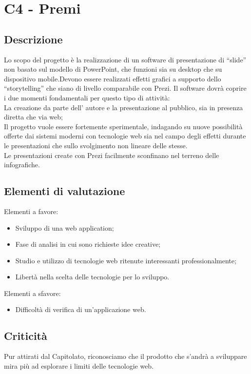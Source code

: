 \section{C4 - Premi}{
 \subsection{Descrizione}
   Lo scopo del progetto è la realizzazione di un software di presentazione di “slide” non basato sul modello di PowerPoint, che funzioni sia su desktop che su dispositivo mobile.Devono essere realizzati effetti grafici a supporto dello  “storytelling” che siano di livello comparabile con Prezi.
   Il software dovrà coprire i due momenti fondamentali per questo tipo di attività:\\
   La creazione da parte dell' autore e la presentazione al pubblico, sia in presenza diretta che via web;\\
   Il progetto vuole essere fortemente sperimentale, indagando su nuove possibilità  offerte dai sistemi moderni con tecnologie web sia nel campo degli effetti durante
   le presentazioni che sullo svolgimento non lineare delle stesse.\\
   Le presentazioni create con Prezi facilmente sconfinano nel terreno delle infografiche.
	\subsection{Elementi di valutazione}{
		Elementi a favore:
		\begin{itemize}
			\item Sviluppo di una web application;
			\item Fase di analisi in cui sono richieste idee creative;
			\item Studio e utilizzo di tecnologie web ritenute interessanti professionalmente;
			\item Libertà nella scelta delle tecnologie per lo sviluppo.
		\end{itemize}
		
		Elementi a sfavore:
		\begin{itemize}
			\item Difficoltà di verifica di un'applicazione web.
		\end{itemize}
	}
	\subsection{Criticità}{
		Pur attirati dal Capitolato, riconosciamo che il prodotto che s'andrà a sviluppare mira più ad esplorare i limiti delle tecnologie web.
	}
}




